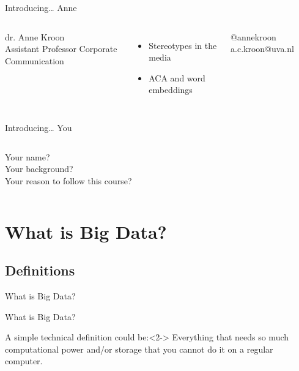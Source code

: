 \documentclass{beamer}
\begin{document}
\begin{frame}{Introducing\ldots} {\huge{Anne}} \small{} 
	\begin{columns}[]    dr. Anne Kroon \\ 
Assistant Professor Corporate Communication
 \begin{itemize} 
 	\item Stereotypes in the media
 	\item ACA and word embeddings
 \end{itemize} @annekroon ~~ a.c.kroon@uva.nl \end{columns} \end{frame}



\begin{frame}{Introducing\ldots}
	{\huge{You}}
	\small{}
	\begin{columns}
		Your name?\\
		Your background?\\
		Your reason to follow this course?
	\end{columns}
\end{frame}





\section{What is Big Data?}
\subsection{Definitions}

\begin{frame}
What is Big Data?
\end{frame}


{
\begin{frame}[plain]
\end{frame}
}



\begin{frame}{What is Big Data?}
\begin{block}{A simple technical definition could be:}<2->
Everything that needs so much computational power and/or storage that you cannot do it on a regular computer.
\end{block}
\end{frame}
\end{document}
